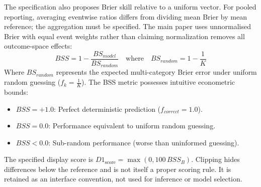 The specification also proposes Brier skill relative to a uniform vector. For pooled reporting, averaging eventwise ratios differs from dividing mean Brier by mean reference; the aggregation must be specified. The main paper uses unnormalised Brier with equal event weights rather than claiming normalization removes all outcome-space effects:
\begin{equation}
    BSS = 1 - \frac{BS_{model}}{BS_{random}} \quad \text{where} \quad BS_{random} = 1 - \frac{1}{K}
\end{equation}
Where $BS_{random}$ represents the expected multi-category Brier error under uniform random guessing ($f_k = \frac{1}{K}$). The BSS metric possesses intuitive econometric bounds:
\begin{itemize}
    \item $BSS = +1.0$: Perfect deterministic prediction ($f_{correct} = 1.0$).
    \item $BSS = 0.0$: Performance equivalent to uniform random guessing.
    \item $BSS < 0.0$: Sub-random performance (worse than uninformed guessing).
\end{itemize}
The specified display score is $D1_{\mathrm{score}}=\max(0,100\,BSS_B)$. Clipping hides differences below the reference and is not itself a proper scoring rule. It is retained as an interface convention, not used for inference or model selection.

